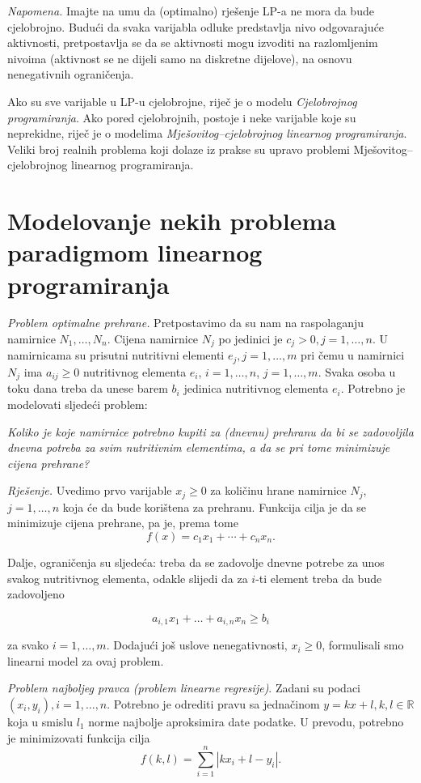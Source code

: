 \documentclass[a4paper, utf8, 11pt, colorlinks]{book}
\begin{document}
\textit{Napomena.} Imajte na umu da (optimalno) rješenje LP-a ne mora da bude cjelobrojno. Budući da svaka varijabla odluke predstavlja nivo odgovarajuće aktivnosti, pretpostavlja se da se aktivnosti mogu izvoditi na razlomljenim nivoima (aktivnost  se ne dijeli samo na diskretne dijelove), na osnovu nenegativnih ograničenja.  

Ako su sve varijable u LP-u cjelobrojne, riječ je o modelu \emph{Cjelobrojnog programiranja}. Ako pored cjelobrojnih, postoje i neke varijable koje su neprekidne, riječ je o modelima \emph{Mješovitog--cjelobrojnog linearnog programiranja}. Veliki broj realnih problema koji dolaze iz prakse su upravo problemi Mješovitog--cjelobrojnog linearnog programiranja.

\section{Modelovanje nekih problema paradigmom linearnog programiranja}\label{sec:modeli_lp}

\emph{Problem optimalne prehrane.} Pretpostavimo da su nam na raspolaganju namirnice $N_1, \ldots, N_n$. Cijena namirnice $N_j$ po jedinici je $c_j>0, j = 1, \ldots, n$. U namirnicama su prisutni nutritivni elementi $e_j,j=1,\ldots,m$ pri čemu
u namirnici $N_j$ ima $a_{ij} \geq 0$ nutritivnog elementa $e_i$, $i = 1, \ldots, n$, $j = 1, \ldots, m$. Svaka osoba u toku dana treba da unese barem $b_i$
jedinica nutritivnog elementa $e_i$. Potrebno je modelovati
sljedeći problem: 

\emph{Koliko je koje namirnice potrebno kupiti za (dnevnu) prehranu da bi se zadovoljila dnevna
potreba za svim nutritivnim elementima, a da se pri tome minimizuje cijena prehrane?}
 
 \emph{Rješenje.}  Uvedimo prvo varijable $x_j \geq 0$ za količinu hrane namirnice $N_j$, $j = 1, \ldots, n$ koja će da bude korištena za prehranu. Funkcija cilja je da se minimizuje cijena prehrane, pa je, prema tome 
 $$f(x) = c_1 x_1 + \cdots + c_n x_n.$$
 
 Dalje, ograničenja su sljedeća: treba da se zadovolje dnevne potrebe za unos svakog nutritivnog elementa, odakle slijedi da za $i$-ti element treba da bude zadovoljeno
 
 $$ a_{i,1} x_1 + \ldots + a_{i,n} x_n \geq b_i $$
 
 za svako $i=1,\ldots,m$. Dodajući još uslove nenegativnosti, $x_i \geq 0$, formulisali smo linearni model za ovaj problem.  
 
\emph{Problem najboljeg pravca (problem linearne regresije)}. Zadani su podaci $(x_i, y_i), i = 1, \ldots , n$. Potrebno je odrediti pravu sa jednačinom $y = k x + l,
k, l \in \mathbb{R}$ koja u smislu $l_1$ norme najbolje aproksimira date podatke. U prevodu, potrebno je minimizovati  funkcija cilja $$f(k, l) = \sum_{i=1}^n |k x_i + l - y_i|.$$
\end{document}
